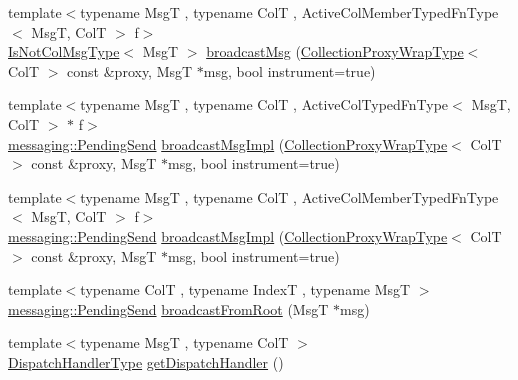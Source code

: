 \begin{DoxyCompactItemize}
\item 
{\footnotesize template$<$typename MsgT , typename ColT , Active\+Col\+Member\+Typed\+Fn\+Type$<$ Msg\+T, Col\+T $>$ f$>$ }\\\hyperlink{structvt_1_1vrt_1_1collection_1_1_collection_manager_ae376deeefd4f89a0b1c93849977715d9}{Is\+Not\+Col\+Msg\+Type}$<$ MsgT $>$ \hyperlink{structvt_1_1vrt_1_1collection_1_1_collection_manager_a42cfab20eec557ba82f70d90afa3e7a1}{broadcast\+Msg} (\hyperlink{structvt_1_1vrt_1_1collection_1_1_collection_manager_a56458ed7f9bb22b631b9b3a745f42f94}{Collection\+Proxy\+Wrap\+Type}$<$ ColT $>$ const \&proxy, MsgT $\ast$msg, bool instrument=true)
\item 
{\footnotesize template$<$typename MsgT , typename ColT , Active\+Col\+Typed\+Fn\+Type$<$ Msg\+T, Col\+T $>$ $\ast$ f$>$ }\\\hyperlink{structvt_1_1messaging_1_1_pending_send}{messaging\+::\+Pending\+Send} \hyperlink{structvt_1_1vrt_1_1collection_1_1_collection_manager_ac7a9c72784d76ddf0346926bbb147e8c}{broadcast\+Msg\+Impl} (\hyperlink{structvt_1_1vrt_1_1collection_1_1_collection_manager_a56458ed7f9bb22b631b9b3a745f42f94}{Collection\+Proxy\+Wrap\+Type}$<$ ColT $>$ const \&proxy, MsgT $\ast$msg, bool instrument=true)
\item 
{\footnotesize template$<$typename MsgT , typename ColT , Active\+Col\+Member\+Typed\+Fn\+Type$<$ Msg\+T, Col\+T $>$ f$>$ }\\\hyperlink{structvt_1_1messaging_1_1_pending_send}{messaging\+::\+Pending\+Send} \hyperlink{structvt_1_1vrt_1_1collection_1_1_collection_manager_ac7a9c72784d76ddf0346926bbb147e8c}{broadcast\+Msg\+Impl} (\hyperlink{structvt_1_1vrt_1_1collection_1_1_collection_manager_a56458ed7f9bb22b631b9b3a745f42f94}{Collection\+Proxy\+Wrap\+Type}$<$ ColT $>$ const \&proxy, MsgT $\ast$msg, bool instrument=true)
\item 
{\footnotesize template$<$typename ColT , typename IndexT , typename MsgT $>$ }\\\hyperlink{structvt_1_1messaging_1_1_pending_send}{messaging\+::\+Pending\+Send} \hyperlink{structvt_1_1vrt_1_1collection_1_1_collection_manager_a53567bdf285983b92dd4094721f8a4fd}{broadcast\+From\+Root} (MsgT $\ast$msg)
\item 
{\footnotesize template$<$typename MsgT , typename ColT $>$ }\\\hyperlink{structvt_1_1vrt_1_1collection_1_1_collection_manager_a0cfe02a0426e95ec9daa2ef7374e07c7}{Dispatch\+Handler\+Type} \hyperlink{structvt_1_1vrt_1_1collection_1_1_collection_manager_ab672ad6c3bc9fdc5a9577a9ae0677d1f}{get\+Dispatch\+Handler} ()

\end{DoxyCompactItemize}
